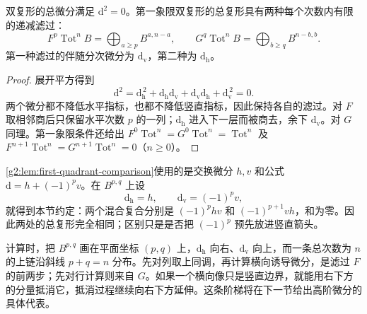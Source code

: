 \begin{proposition}\label{g2:prop:total-complex-filtrations}
	双复形的总微分满足 \(\mathrm d^2=0\)。第一象限双复形的总复形具有两种每个次数内有限的递减滤过：
	\begin{equation}\label{g2:eq:column-row-filtrations}
		F^p\operatorname{Tot}^nB=\bigoplus_{a\ge p}B^{a,n-a},\qquad
		G^q\operatorname{Tot}^nB=\bigoplus_{b\ge q}B^{n-b,b}.
	\end{equation}
	第一种滤过的伴随分次微分为 \(\mathrm d_{\mathrm v}\)，第二种为 \(\mathrm d_{\mathrm h}\)。
\end{proposition}
\begin{proof}
	展开平方得到
	\[
		\mathrm d^2=\mathrm d_{\mathrm h}^{\,2}
		+\mathrm d_{\mathrm h}\mathrm d_{\mathrm v}
		+\mathrm d_{\mathrm v}\mathrm d_{\mathrm h}
		+\mathrm d_{\mathrm v}^{\,2}=0.
	\]
	两个微分都不降低水平指标，也都不降低竖直指标，因此保持各自的滤过。对 \(F\) 取相邻商后只保留水平次数 \(p\) 的一列；\(\mathrm d_{\mathrm h}\) 进入下一层而被商去，余下 \(\mathrm d_{\mathrm v}\)。对 \(G\) 同理。第一象限条件还给出 \(F^0\operatorname{Tot}^n=G^0\operatorname{Tot}^n=\operatorname{Tot}^n\) 及 \(F^{n+1}\operatorname{Tot}^n=G^{n+1}\operatorname{Tot}^n=0\)（\(n\ge0\)）。
\end{proof}

\cref{g2:lem:first-quadrant-comparison}使用的是交换微分 \(h,v\) 和公式 \(\mathrm d=h+(-1)^pv\)。在 \(B^{p,q}\) 上设
\[
	\mathrm d_{\mathrm h}=h,\qquad \mathrm d_{\mathrm v}=(-1)^pv,
\]
就得到本节约定：两个混合复合分别是 \((-1)^phv\) 和 \((-1)^{p+1}vh\)，和为零。因此两处的总复形完全相同；区别只是是否把 \((-1)^p\) 预先放进竖直箭头。

\ProseParagraphBreak

计算时，把 \(B^{p,q}\) 画在平面坐标 \((p,q)\) 上，\(\mathrm d_{\mathrm h}\) 向右、\(\mathrm d_{\mathrm v}\) 向上，而一条总次数为 \(n\) 的上链沿斜线 \(p+q=n\) 分布。先对列取上同调，再计算横向诱导微分，是滤过 \(F\) 的前两步；先对行计算则来自 \(G\)。如果一个横向像只是竖直边界，就能用右下方的分量抵消它，抵消过程继续向右下方延伸。这条阶梯将在下一节给出高阶微分的具体代表。
